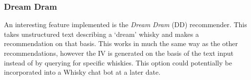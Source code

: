 \subsubsection{Dream Dram}
An interesting feature implemented is the \emph{Dream Dram} (DD) recommender.  This takes unstructured text describing
a `dream' whisky and makes a recommendation on that basis. This works in much the same way as the other recommendations, 
however the IV is generated on the basis of the text input instead of by querying for specific whiskies. This option 
could potentially be incorporated into a Whisky chat bot at a later date.
